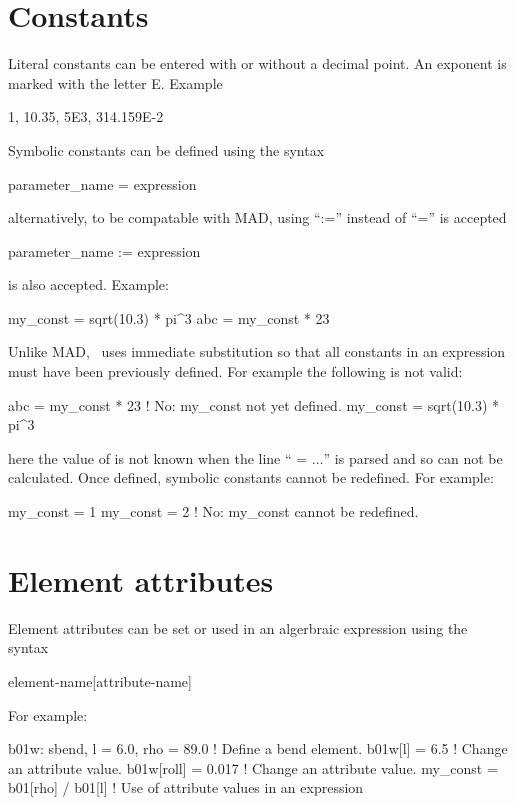 \section{Constants}

Literal constants can be entered with or without a decimal point. An
exponent is marked with the letter E. Example
\begin{example}
  1, 10.35, 5E3, 314.159E-2
\end{example}
Symbolic constants can be defined using the syntax
\begin{example}
  parameter_name = expression
\end{example}
alternatively, to be compatable with MAD, using ``:='' instead of ``='' is accepted
\begin{example}
  parameter_name := expression
\end{example}
is also accepted. Example:
\begin{example}
  my_const = sqrt(10.3) * pi^3
  abc      = my_const * 23
\end{example}
Unlike MAD, \bmad\ uses immediate substitution so that all constants
in an expression must have been previously defined. For example the
following is not valid:
\begin{example}
  abc      = my_const * 23   ! No: my_const not yet defined.
  my_const = sqrt(10.3) * pi^3
\end{example}
here the value of  is not known when the line ``
= $\ldots$'' is parsed and so  can not be calculated. Once
defined, symbolic constants cannot be redefined. For example:
\begin{example}
  my_const = 1
  my_const = 2  ! No: my_const cannot be redefined.
\end{example}


\section{Element attributes}

Element attributes can be set or used in an algerbraic expression using the syntax
\begin{example}
  element-name[attribute-name]
\end{example}
For example:
\begin{example}
  b01w: sbend, l = 6.0, rho = 89.0   ! Define a bend element.
  b01w[l] = 6.5                      ! Change an attribute value.
  b01w[roll] = 0.017                 ! Change an attribute value.
  my_const = b01[rho] / b01[l]       ! Use of attribute values in an expression
\end{example}

